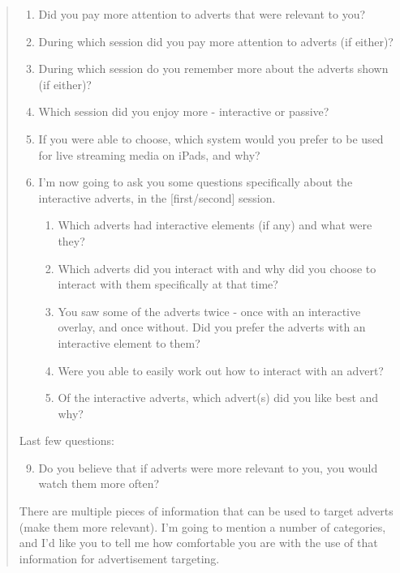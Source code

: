 \begin{quotation}
\begin{enumerate}
		\item Did you pay more attention to adverts that were relevant to you?
		\item During which session did you pay more attention to adverts (if either)?
		\item During which session do you remember more about the adverts shown (if either)?
		\item Which session did you enjoy more - interactive or passive?
		\item If you were able to choose, which system would you prefer to be used for live streaming media on iPads, and why?
		\item I'm now going to ask you some questions specifically about the interactive adverts, in the [first/second] session.
		\begin{enumerate}[label=\alph*]
			\item Which adverts had interactive elements (if any) and what were they?
			\item Which adverts did you interact with and why did you choose to interact with them specifically at that time?
			\item You saw some of the adverts twice - once with an interactive overlay, and once without. Did you prefer the adverts with an interactive element to them?
			\item Were you able to easily work out how to interact with an advert?
			\item Of the interactive adverts, which advert(s) did you like best and why?
		\end{enumerate}
	\end{enumerate}

	Last few questions:

	\begin{enumerate}
	  	\setcounter{enumi}{8}
		\item Do you believe that if adverts were more relevant to you, you would watch them more often?
	\end{enumerate}

	There are multiple pieces of information that can be used to target adverts (make them more relevant). I'm going to mention a number of categories, and I'd like you to tell me how comfortable you are with the use of that information for advertisement targeting.


\end{quotation}
